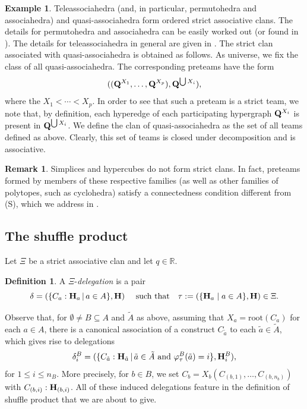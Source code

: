 \documentclass{article}
\theoremstyle{plain}
\theoremstyle{definition}
\newtheorem{definition}[thm]{Definition}
\newtheorem{remark}[thm]{Remark}
\newtheorem{example}[thm]{\sc Example}
\newcommand{\set}[1]{\{#1\}}
\newcommand{\setc}[2]{\set{#1 \mid #2}}
\newcommand{\hyper}[1]{{\bf #1}}
\begin{document}
\begin{example}
Teleassociahedra (and, in particular, permutohedra and associahedra) and quasi-associahedra form ordered strict associative clans. The details for permutohedra and associahedra can be easily worked out (or found in \cite[Section 4]{PLBJ1}). The details for teleassociahedra in general are given in \cite[Example 4.3]{PLBJ2}. The strict clan associated with quasi-associahedra is obtained as follows. As universe, we fix the class of all quasi-associahedra. The corresponding preteams have the form $$(({\bf Q}^{X_1},\dots,{\bf Q}^{X_p}),{\bf Q}^{\bigcup X_i}),$$ where the $X_1<\cdots <X_p$. In order to see that such a preteam is a strict team, we note that, by definition, each hyperedge of each participating hypergraph ${\bf Q}^{X_i}$ is present in ${\bf Q}^{{\bigcup X_i}}$. We define the clan of quasi-associahedra as the set of all teams
defined as above. Clearly, this set of teams is closed under decomposition and is associative.
\end{example}
\begin{remark}
Simplices and hypercubes do not form strict clans. In fact, preteams formed by members of these respective families (as well as other families of polytopes, such as cyclohedra) satisfy a connectedness condition different from (S), which we address in \cite{PLBJ2}.
\end{remark}



 \subsection{The shuffle product} \label{spr}
 Let $\Xi$ be a strict associative clan and let $q\in{\mathbb R}$. 

\begin{definition}
A $\Xi$-\emph{delegation} is a pair 
$$\delta=(\{C_a:{\bf H}_a\,|\, a\in A\},{\bf H}) \quad\mbox{
such that}\quad \tau:=(\setc{\hyper{H}_a}{a\in A},\hyper{H})\in \Xi.$$
\end{definition}

 Observe that, for $\emptyset \neq B\subseteq A$ and $\tilde{A}$ as above, assuming that $X_a=\mbox{root}(C_a)$ for each $a\in A$, there is a canonical association of a construct $C_{\tilde{a}}$ to each $\tilde{a}\in \tilde{A}$, which gives rise to delegations \begin{equation}\label{deltas}\delta^B_i=(\{C_{\tilde{a}}:{\bf H}_{\tilde{a}}\,|\, \tilde{a}\in \tilde{A} \mbox{ and }\varphi^B_\tau(\tilde{a})=i\},{\bf H}_i^B),\end{equation} for $1\leq i\leq n_B$. More precisely, for $b\in B$, we set $C_b=X_b(C_{(b,1)},\ldots,C_{(b,n_b)})$ with $C_{(b,i)}:\hyper{H}_{(b,i)}$. All of these induced delegations feature in the definition of shuffle product that we are about to give.
 
\end{document}
